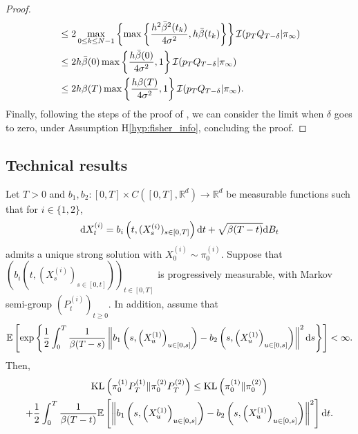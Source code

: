 \documentclass[english,graybox,envcountchap,envcountsame,sectrefs,shortlabels]{svmono}
\theoremstyle{style}
\newcommand{\eqsp}{}
\newcommand{\kl}{\mathrm{KL}}
\begin{document}
\begin{proof}
\begin{align*}
    & \leq
    2 \max_{0 \leq k \leq N-1}
    \left\{\max \left\{ \frac{  h^2 \bar \sched^2 (t_k)  }{4 \sigma^2} , h \bar \sched(t_k)  \right\} \right\}  \mathcal{I}(p_{T} Q_{T-\delta} | \pi_{\infty})   \\
    & \leq 2 h \bar \sched (0) \max \left\{ \frac{  h \bar \sched (0)  }{ 4 \sigma^2} , 1  \right\} \mathcal{I}(p_{T} Q_{T-\delta} | \pi_{\infty})   \\
    & \leq 2 h  \beta (T) \max \left\{ \frac{  h  \beta (T)  }{ 4 \sigma^2} , 1  \right\} \mathcal{I}(p_T Q_{T-\delta} | \pi_{\infty}) \eqsp.
\end{align*}
Finally, following the steps of the proof of \cite[Lemma 2]{conforti2023}, we can consider the limit when $\delta$ goes to zero, under Assumption H\ref{hyp:fisher_info}, concluding the proof.

\end{proof}

\subsection{Technical results}

\begin{lemma} \label{tvboundgirsanovproof} 
Let  $T > 0$ and $b_1, b_2 : [0, T] \times C([0, T], \mathbb{R}^d) \rightarrow \mathbb{R}^d $ be measurable functions such that for $i\in \{1, 2\}$,
\begin{align}\label{eq:uniqueness_KL_SDE}
\mathrm{d} X_t^{(i)} = b_i\left(t, ( X_s^{(i)})_{s \in [0, T]}\right) \mathrm{d} t + \sqrt{\beta(T-t)} \mathrm{d} B_t
\end{align}
admits a unique strong solution with  $X_0^{(i)} \sim  \pi_0^{(i)}$. Suppose that $(b_i(t, (X_s^{(i)})_{s \in [0, t]}))_{t \in [0, T]} $  is progressively measurable, with Markov semi-group $(P_t^{(i)})_{t \ge 0}$. In addition, assume that 
\begin{equation}
\label{eq:novi}
  \mathbb{E} \left[ \exp\left\{  \frac{1}{2} \int_0^T \frac{1}{{\sched(T-s)}}  \left\|b_1\left(s, \left(X^{(1)}_u\right)_{ u \in [0,s]}\right) - b_2\left(s, \left(X^{(1)}_u\right)_{ u \in [0,s]}\right) \right\|^2 \rmd s \right\} \right] < \infty\eqsp.  
\end{equation}
Then,
\begin{multline}
\kl \left( \pi_0^{(1)} P_T^{(1)} \| \pi_0^{(2)} P_T^{(2)} \right) \leq \kl \left(\pi_0^{(1)} \| \pi_0^{(2)} \right)\\
+ \frac{1}{2} \int_0^T \frac{1}{\sched(T-t)} \mathbb{E}\left[\left\|b_1\left(s, \left(X^{(1)}_u\right)_{ u \in [0,s]}\right) - b_2\left(s, \left(X^{(1)}_u\right)_{ u \in [0,s]}\right) \right\|^2\right] \rmd t\eqsp. 
\end{multline}
\end{lemma} 
\end{document}
